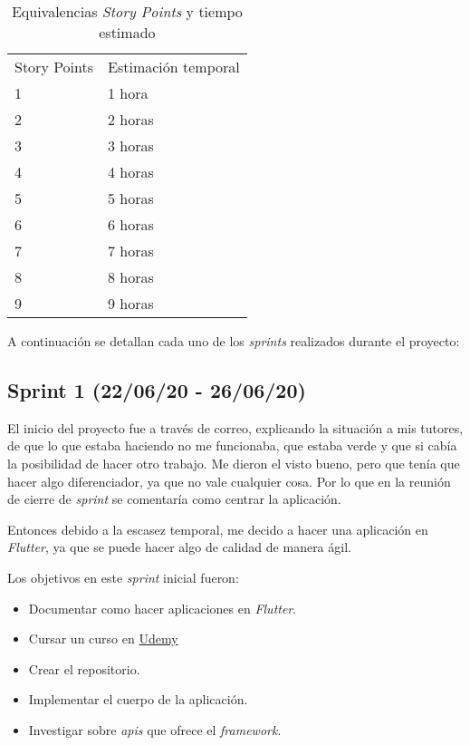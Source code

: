 \begin{table}[H]
	\centering
	\begin{tabular}{l l }
		\toprule
		{Story Points} & Estimación temporal \\
		1            & 1 hora              \\ 
		2            & 2 horas           \\ 
		3            & 3 horas             \\ 
		4            & 4 horas           \\ 
		5            & 5 horas             \\ 
		6            & 6 horas           \\ 
		7            & 7 horas             \\ 
		8            & 8 horas             \\ 
		9            & 9 horas             \\ \bottomrule
	\end{tabular}
	\caption{Equivalencias \emph{Story Points} y tiempo estimado}
	\label{tabla:storypoint}
\end{table}

A continuación se detallan cada uno de los \emph{sprints} realizados durante el proyecto:

\subsection{Sprint 1 (22/06/20 - 26/06/20)}\label{sprint-1-220620---260620}

El inicio del proyecto fue a través de correo, explicando la situación a mis tutores, de que lo que estaba haciendo no me funcionaba, que estaba verde y que si cabía la posibilidad de hacer otro trabajo. Me dieron el visto bueno, pero que tenía que hacer algo diferenciador, ya que no vale cualquier cosa. Por lo que en la reunión de cierre de \emph{sprint} se comentaría como centrar la aplicación. 

Entonces debido a la escasez temporal, me decido a hacer una aplicación en \emph{Flutter}, ya que se puede hacer algo de calidad de manera ágil.

Los objetivos en este \emph{sprint} inicial fueron:

\begin{itemize}
\item Documentar como hacer aplicaciones en \emph{Flutter}.
\item Cursar un curso en \href{https://www.udemy.com/course/flutter-primeros-pasos/}{Udemy}
\item Crear el repositorio.
\item Implementar el cuerpo de la aplicación.
\item Investigar sobre \emph{apis} que ofrece el \emph{framework}.
\end{itemize}

